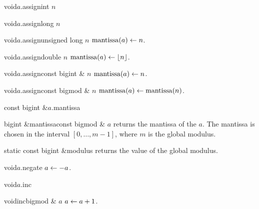 \begin{fcode}{void}{$a$.assign}{int $n$}\end{fcode}
\begin{fcode}{void}{$a$.assign}{long $n$}\end{fcode}
\begin{fcode}{void}{$a$.assign}{unsigned long $n$}
  $\operatorname{mantissa}(a) \leftarrow n$.
\end{fcode}

\begin{fcode}{void}{$a$.assign}{double $n$}
  $\operatorname{mantissa}(a) \leftarrow \lfloor n \rfloor$.
\end{fcode}

\begin{fcode}{void}{$a$.assign}{const bigint & $n$}
  $\operatorname{mantissa}(a) \leftarrow n$.
\end{fcode}

\begin{fcode}{void}{$a$.assign}{const bigmod & $n$}
  $\operatorname{mantissa}(a) \leftarrow \operatorname{mantissa}(n)$.
\end{fcode}



\ACCS

\begin{fcode}{const bigint &}{$a$.mantissa}{}\end{fcode}
\begin{cfcode}{bigint &}{mantissa}{const bigmod & $a$}
  returns the mantissa of the  $a$.  The mantissa is chosen in the interval
  $[0,\dots , m-1]$, where $m$ is the global modulus.
\end{cfcode}

\begin{cfcode}{static const bigint &}{modulus}{}
  returns the value of the global modulus.
\end{cfcode}



\MODF

\begin{fcode}{void}{$a$.negate}{}
  $a \leftarrow -a$.
\end{fcode}

\begin{fcode}{void}{$a$.inc}{}\end{fcode}
\begin{fcode}{void}{inc}{bigmod & $a$}
  $a \leftarrow a + 1$.
\end{fcode}


